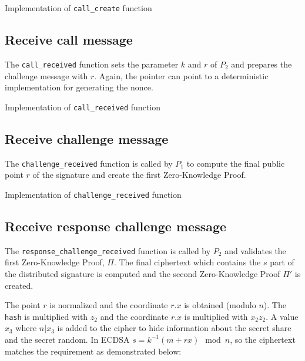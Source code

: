 \begin{longlisting}
	\caption{Implementation of \texttt{call\_create} function}
	\label{lst:implCallCreateFunc}
\end{longlisting}

\subsection{Receive call message}

The \texttt{call\_received} function sets the parameter $k$ and $r$ of $P_2$ and
prepares the challenge message with $r$. Again, the pointer can point to a
deterministic implementation for generating the nonce.

\begin{longlisting}
	\caption{Implementation of \texttt{call\_received} function}
	\label{lst:implCallReceivedFunc}
\end{longlisting}

\subsection{Receive challenge message}

The \texttt{challenge\_received} function is called by $P_1$ to compute the
final public point $r$ of the signature and create the first Zero-Knowledge
Proof.

\begin{longlisting}
	\caption{Implementation of \texttt{challenge\_received} function}
	\label{lst:implChallengeReceivedFunc}
\end{longlisting}

\subsection{Receive response challenge message}

The \texttt{response\_challenge\_received} function is called by $P_2$ and
validates the first Zero-Knowledge Proof, $\Pi$. The final ciphertext which
contains the $s$ part of the distributed signature is computed and the second
Zero-Knowledge Proof $\Pi'$ is created.

The point $r$ is normalized and the coordinate $r.x$ is obtained (modulo $n$). The
\texttt{hash} is multiplied with $z_2$ and the coordinate $r.x$ is multiplied
with $x_2z_2$. A value $x_3$ where $n|x_3$ is added to the cipher to hide
information about the secret share and the secret random. In ECDSA $s = k^{-1}(m +
rx) \mod n$, so the ciphertext matches the requirement as demonstrated below:

